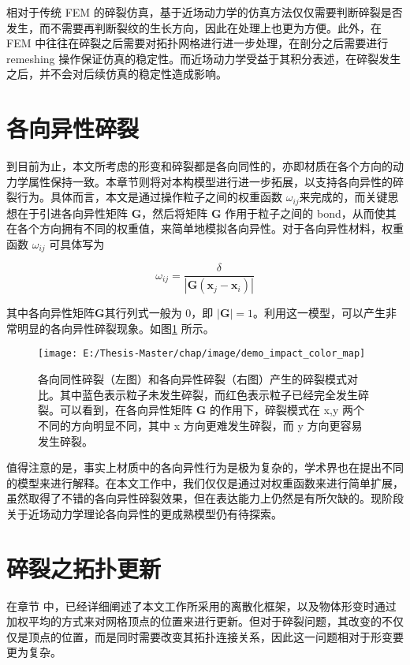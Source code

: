 相对于传统 FEM 的碎裂仿真，基于近场动力学的仿真方法仅仅需要判断碎裂是否发生，而不需要再判断裂纹的生长方向，因此在处理上也更为方便。此外，在 FEM 中往往在碎裂之后需要对拓扑网格进行进一步处理，在剖分之后需要进行 remeshing 操作保证仿真的稳定性。而近场动力学受益于其积分表述，在碎裂发生之后，并不会对后续仿真的稳定性造成影响。

\section{各向异性碎裂}
到目前为止，本文所考虑的形变和碎裂都是各向同性的，亦即材质在各个方向的动力学属性保持一致。本章节则将对本构模型进行进一步拓展，以支持各向异性的碎裂行为。具体而言，本文是通过操作粒子之间的权重函数 $\omega_{ij}$来完成的，而关键思想在于引进各向异性矩阵 $\mathbf{G}$，然后将矩阵 $\mathbf{G}$ 作用于粒子之间的 bond，从而使其在各个方向拥有不同的权重值，来简单地模拟各向异性。对于各向异性材料，权重函数 $\omega_{ij}$ 可具体写为

\begin{equation}
\omega_{ij}=\frac{\delta}{|\mathbf{G}(\mathbf{x}_j-\mathbf{x}_i)|}
\end{equation}

其中各向异性矩阵$\mathbf{G}$其行列式一般为 0，即 $|\mathbf{G}| = 1$。利用这一模型，可以产生非常明显的各向异性碎裂现象。如图\ref{demo_impact_color_map} 所示。

\begin{figure}[!htb]
  \centering
  \captionsetup{justification=centering}
  \texttt{[image: E:/Thesis-Master/chap/image/demo\_impact\_color\_map]}

  \caption{\label{demo_impact_color_map}
           各向同性碎裂（左图）和各向异性碎裂（右图）产生的碎裂模式对比。其中蓝色表示粒子未发生碎裂，而红色表示粒子已经完全发生碎裂。可以看到，在各向异性矩阵 $\mathbf{G}$ 的作用下，碎裂模式在 x,y 两个不同的方向明显不同，其中 x 方向更难发生碎裂，而 y 方向更容易发生碎裂。
          }
\end{figure}

值得注意的是，事实上材质中的各向异性行为是极为复杂的，学术界也在提出不同的模型来进行解释。在本文工作中，我们仅仅是通过对权重函数来进行简单扩展，虽然取得了不错的各向异性碎裂效果，但在表达能力上仍然是有所欠缺的。现阶段关于近场动力学理论各向异性的更成熟模型仍有待探索。

\section{碎裂之拓扑更新}
在章节 \label{discretization} 中，已经详细阐述了本文工作所采用的离散化框架，以及物体形变时通过加权平均的方式来对网格顶点的位置来进行更新。但对于碎裂问题，其改变的不仅仅是顶点的位置，而是同时需要改变其拓扑连接关系，因此这一问题相对于形变要更为复杂。

